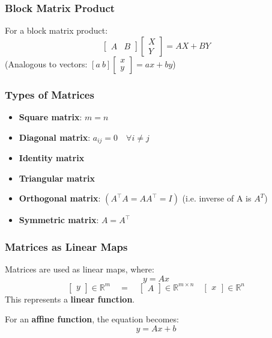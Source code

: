     \subsubsection{Block Matrix Product}
    \begin{definition}
        For a block matrix product:
        \begin{equation}
            \begin{bmatrix}
                A & B
                \end{bmatrix}
                \begin{bmatrix}
                X \\ Y
                \end{bmatrix}
                = AX + BY
        \end{equation}
        (Analogous to vectors: \( [a \ b] \begin{bmatrix} x \\ y \end{bmatrix} = a x + b y \))
    \end{definition}

    \subsubsection{Types of Matrices}
    \begin{definition}
        \begin{itemize}
            \item \textbf{Square matrix}: \(m = n\)
            \item \textbf{Diagonal matrix}: \(a_{ij} = 0 \quad \forall i \neq j\)
            \item \textbf{Identity matrix}
            \item \textbf{Triangular matrix}
            \item \textbf{Orthogonal matrix}: \((A^\top A = A A^\top = I)\) (i.e. inverse of A is $A^T$)
            \item \textbf{Symmetric matrix}: \(A = A^\top\)
        \end{itemize}
    \end{definition}

    \subsubsection{Matrices as Linear Maps}
    \begin{definition}
        Matrices are used as linear maps, where:
        \[
        y = A x
        \]
        \[
        \begin{bmatrix} y \end{bmatrix} \in \mathbb{R}^m \quad = \quad \begin{bmatrix} A \end{bmatrix} \in \mathbb{R}^{m \times n} \quad \begin{bmatrix} x \end{bmatrix} \in \mathbb{R}^n
        \]
        This represents a \textbf{linear function}.
        \vspace{1em}

        For an \textbf{affine function}, the equation becomes:
        \[
        y = A x + b
        \]
    \end{definition}

